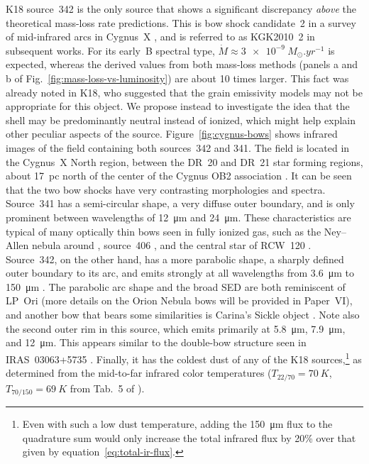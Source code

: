 K18 source~342 is the only source that shows a significant discrepancy
\textit{above} the theoretical mass-loss rate predictions.  This is
bow shock candidate~2 in a survey of mid-infrared arcs in Cygnus~X
\citep{Kobulnicky:2010a}, and is referred to as KGK2010~2 in
subsequent works.  For its early~B spectral type,
\(\dot{M} \approx \SI{3e-9}{M_\odot.yr^{-1}}\) is expected, whereas the derived
values from both mass-loss methods (panels a and b of
Fig.~\ref{fig:mass-loss-vs-luminosity}) are about 10 times larger.
This fact was already noted in K18, who suggested that the grain
emissivity models may not be appropriate for this object.  We propose
instead to investigate the idea that the shell may be predominantly
neutral instead of ionized, which might help explain other peculiar
aspects of the source.  Figure~\ref{fig:cygnus-bows} shows infrared
images of the field containing both sources~342 and 341.  The field is
located in the Cygnus~X North region, between the DR~20 and DR~21 star
forming regions, about \SI{17}{pc} north of the center of the Cygnus
OB2 association \citep[e.g.,][]{Schneider:2016a}.  It can be seen that
the two bow shocks have very contrasting morphologies and spectra.
Source~341 has a semi-circular shape, a very diffuse outer boundary,
and is only prominent between wavelengths of \SI{12}{\um} and
\SI{24}{\um}.  These characteristics are typical of many optically
thin bows seen in fully ionized gas, such as the Ney--Allen nebula
around \thD{} \citetext{compare the bow shape in Fig.~3a of
  \citealp{Smith:2005a}}, source~406 \citetext{HD~92607, which is
  ERO~36 in Carina, \citealp{Sexton:2015b}}, and the central star of
RCW~120 \citetext{not included in current samples, but see
  \citealp{Mackey:2015a, Mackey:2016a}}.  Source~342, on the other
hand, has a more parabolic shape, a sharply defined outer boundary to
its arc, and emits strongly at all wavelengths from \SI{3.6}{\um} to
\SI{150}{\um} \citetext{see also Fig.~13 of
  \citealp{Kobulnicky:2010a}}.  The parabolic arc shape and the broad
SED are both reminiscent of LP~Ori (more details on the Orion Nebula
bows will be provided in Paper~VI), and another bow that bears some
similarities is Carina's Sickle object \citetext{ERO~21
  \citealp{Sexton:2015b}, see also \citealp{Ngoumou:2013a} and \S~4 of
  \citealp{Hartigan:2015a}}.  Note also the second outer rim in this
source, which emits primarily at \SI{5.8}{\um}, \SI{7.9}{\um}, and
\SI{12}{\um}. This appears similar to the double-bow structure seen in
IRAS~03063+5735 \citep{Kobulnicky:2012a}.  Finally, it has the coldest
dust of any of the K18 sources,\footnote{%
  Even with such a low dust temperature, adding the \SI{150}{\um} flux
  to the quadrature sum would only increase the total infrared flux by
  20\% over that given by equation~\eqref{eq:total-ir-flux}.} %
as determined from the mid-to-far infrared color temperatures
(\(T_{22/70} = \SI{70}{K}\), \(T_{70/150} = \SI{69}{K}\) from Tab.~5
of \citealp{Kobulnicky:2017a}).


